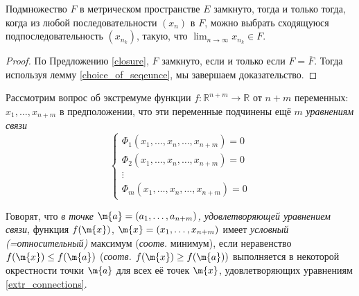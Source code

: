   \begin{corollary}\label{Weirstrass_mega}
    Подмножество $F$ в метрическом пространстве $E$ замкнуто, тогда и только тогда, когда из любой последовательности $(x_n)$ в $F$, можно выбрать сходящуюся подпоследовательность $(x_{n_k})$, такую, что $\lim_{n\to \infty} x_{n_k} \in F$. 
\end{corollary}

\begin{proof}
    По Предложению \ref{closure}, $F$ замкнуто, если и только если $F = \overline{F}$. Тогда используя лемму \ref{choice_of_seqeunce}, мы завершаем доказательство. 
\end{proof}







Рассмотрим вопрос об экстремуме функции $f:\mathbb{R}^{n+m} \to \mathbb{R}$ от $n+m$ переменных: $x_1,\ldots, x_{n+m}$ в предположении, что эти переменные подчинены ещё $m$ \textit{уравнениям связи}
\begin{equation}\label{extr_connections}
   \left\{\begin{matrix}
       \Phi_1(x_1,\ldots, x_{n}, \ldots, x_{n+m}) = 0 \\
       \Phi_2(x_1,\ldots, x_{n}, \ldots, x_{n+m}) = 0 \\
       \vdots\\
       \Phi_m(x_1,\ldots, x_{n}, \ldots, x_{n+m}) = 0
   \end{matrix} \right.   
\end{equation}

\begin{definition}
    Говорят, что \textit{в точке $\m{a} = (a_1,\ldots, a_{n+m})$, удовлетворяющей уравнением связи}, функция $f(\m{x})$, $\m{x} = (x_1,\ldots, x_{n+m})$ имеет \textit{условный (=относительный)} максимум (\textit{соотв.} минимум), если неравенство $f(\m{x}) \le f(\m{a})$ (\textit{соотв.} $f(\m{x}) \ge f(\m{a}))$ выполняется в некоторой окрестности точки $\m{a}$ для всех её точек $\m{x}$, удовлетворяющих уравнениям \ref{extr_connections}.
\end{definition}

